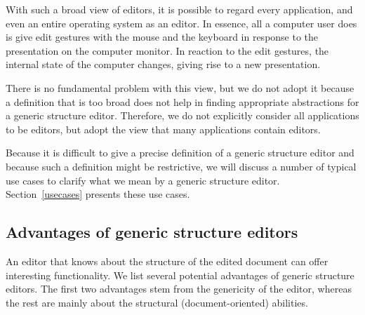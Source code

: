 \documentclass{speauth}
\begin{document}
\bc

With such a broad view of editors, it is possible to regard every application, and even an entire operating system as an editor. In essence, all a computer user does is give edit gestures with the mouse and the keyboard in response to the presentation on the computer monitor. In reaction to the edit gestures, the internal state of the computer changes, giving rise to a new presentation. 

There is no fundamental problem with this view, but we do not adopt it because a definition that is too broad does not help in finding appropriate abstractions for a generic structure editor. Therefore, we do not explicitly consider all applications to be editors, but adopt the view that many applications contain editors.

\ec

Because it is difficult to give a precise definition of a generic structure editor and because such a definition might be restrictive, we will discuss a number of typical use cases to clarify what we mean by a generic structure editor. Section~\ref{usecases} presents these use cases.

\subsection{Advantages of generic structure editors}
An editor that knows about the structure of the edited document can offer interesting functionality. We list several potential advantages of generic structure editors. The first two advantages stem from the genericity of the editor, whereas the rest are mainly about the structural (document-oriented) abilities.
\end{document}
